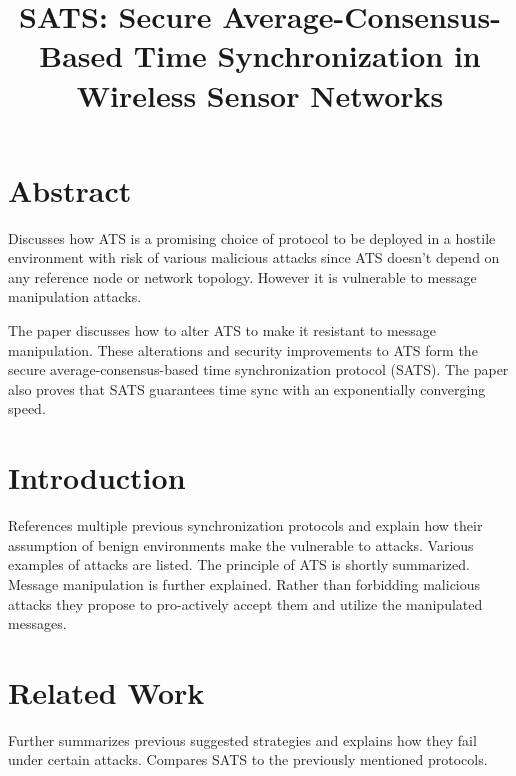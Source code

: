 \documentclass{article}
\title{SATS: Secure Average-Consensus-Based Time Synchronization in Wireless Sensor Networks}
\begin{document}
\maketitle

\section{Abstract}
Discusses how ATS is a promising choice of protocol to be deployed in a hostile environment with risk of various malicious attacks since ATS doesn't depend on any reference node or network topology. However it is vulnerable to message manipulation attacks. 

The paper discusses how to alter ATS to make it resistant to message manipulation. These alterations and security improvements to ATS form the secure average-consensus-based time synchronization protocol (SATS). The paper also proves that SATS guarantees time sync with an exponentially converging speed.

\section{Introduction}
References multiple previous synchronization protocols and explain how their assumption of benign environments make the vulnerable to attacks. Various examples of attacks are listed. The principle of ATS is shortly summarized. Message manipulation is further explained. Rather than forbidding malicious attacks they propose to pro-actively accept them and utilize the manipulated messages.

\section{Related Work}
Further summarizes previous suggested strategies and explains how they fail under certain attacks. Compares SATS to the previously mentioned protocols. 
\end{document}
